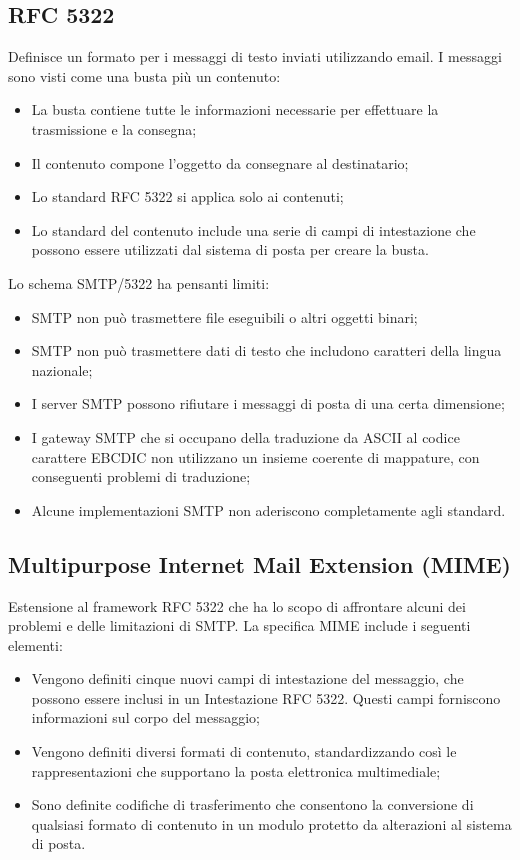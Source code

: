 \subsection{RFC 5322}

Definisce un formato per i messaggi di testo inviati utilizzando email. I messaggi sono visti come una busta più un contenuto:
\begin{itemize}
    \item La busta contiene tutte le informazioni necessarie per effettuare la trasmissione e la consegna;
	\item Il contenuto compone l'oggetto da consegnare al destinatario;
	\item Lo standard RFC 5322 si applica solo ai contenuti;
	\item Lo standard del contenuto include una serie di campi di intestazione che possono essere utilizzati dal sistema di posta per creare la busta.
\end{itemize}

Lo schema SMTP/5322 ha pensanti limiti:
\begin{itemize}
    \item SMTP non può trasmettere file eseguibili o altri oggetti binari;
	\item SMTP non può trasmettere dati di testo che includono caratteri della lingua nazionale;
	\item I server SMTP possono rifiutare i messaggi di posta di una certa dimensione;
	\item I gateway SMTP che si occupano della traduzione da ASCII al codice carattere EBCDIC non utilizzano un insieme coerente di mappature, con conseguenti problemi di traduzione;
	\item Alcune implementazioni SMTP non aderiscono completamente agli standard.
\end{itemize}


\subsection{Multipurpose Internet Mail Extension (MIME)}

Estensione al framework RFC 5322 che ha lo scopo di affrontare alcuni dei problemi e delle limitazioni di SMTP. La specifica MIME include i seguenti elementi:
\begin{itemize}
    \item Vengono definiti cinque nuovi campi di intestazione del messaggio, che possono essere inclusi in un Intestazione RFC 5322. Questi campi forniscono informazioni sul corpo del messaggio;
	\item Vengono definiti diversi formati di contenuto, standardizzando così le rappresentazioni che supportano la posta elettronica multimediale;
	\item Sono definite codifiche di trasferimento che consentono la conversione di qualsiasi formato di contenuto in un modulo protetto da alterazioni al sistema di posta.
\end{itemize}

